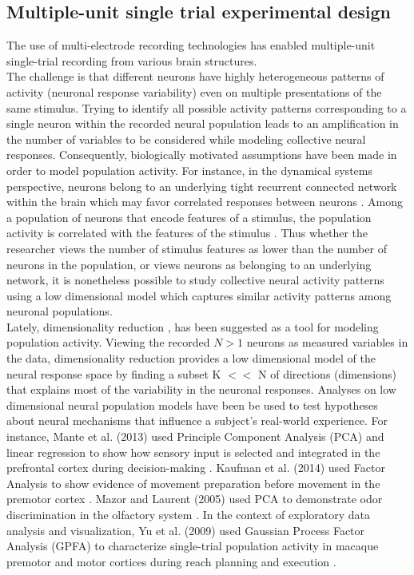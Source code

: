 \subsection{Multiple-unit single trial experimental design}
The use of multi-electrode \cite{Kipke2008} recording technologies has enabled  multiple-unit single-trial recording from various brain structures.\\
The challenge is that different neurons have highly heterogeneous patterns of activity (neuronal response variability) even on multiple presentations of the same stimulus. Trying to identify all possible activity patterns  corresponding to  a single neuron within the recorded neural population leads to an amplification in the number of variables to be considered while modeling collective neural responses. Consequently, biologically motivated assumptions have been made in order to model population activity. For instance, in the dynamical systems perspective, neurons belong to an underlying  tight recurrent connected network within the brain  which may favor correlated responses between neurons \cite{Shenoy2013}.
Among a population of neurons that encode features of a stimulus, the population activity is correlated with the features of the stimulus \cite{Georgopoulos1982, Hubel1968}.
Thus whether the researcher views the number of stimulus features as lower than the number of neurons in the population, or views neurons as belonging to an underlying network, it is nonetheless possible to study collective neural activity patterns using a low dimensional model which captures similar activity patterns among neuronal populations.\\

Lately, dimensionality reduction \cite{Cunningham2014a}, has been suggested as a tool for modeling population activity. Viewing the recorded $N>1$ neurons as measured variables in the data, dimensionality reduction provides a low dimensional model of the neural response space by finding a subset K $<<$ N of directions (dimensions) that explains most of the variability in the neuronal responses. Analyses on low dimensional neural population models have been be used to test hypotheses about neural mechanisms that influence a subject's real-world experience. For instance, Mante et al. (2013) used Principle Component Analysis (PCA) and linear regression to show how sensory input is selected and integrated in the prefrontal cortex during decision-making   \cite{Vos2015}.  Kaufman et al. (2014) used Factor Analysis to show evidence of movement preparation before movement in the premotor cortex \cite{Kaufman2014}.  Mazor and Laurent (2005)  used PCA to demonstrate odor discrimination in the olfactory system \cite{Mazor2005}. In the context of exploratory data analysis and visualization, Yu et al. (2009) used Gaussian Process Factor Analysis (GPFA) to characterize single-trial population activity in  macaque premotor and motor cortices during reach planning and execution  \cite{Yu2009} .\\



